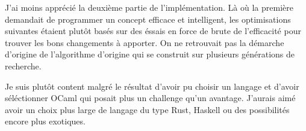 \documentclass[12pt]{article}
\begin{document}
J'ai moins apprécié la deuxième partie de l'implémentation. Là où la
première demandait de programmer un concept efficace et intelligent,
les optimisations suivantes étaient plutôt basés sur des éssais en
force de brute de l'efficacité pour trouver les bons changements à
apporter. On ne retrouvait pas la démarche d'origine de l'algorithme
d'origine qui se construit sur plusieurs générations de recherche.

Je suis plutôt content malgré le résultat d'avoir pu choisir un
langage et d'avoir séléctionner OCaml qui posait plus un challenge
qu'un avantage. J'aurais aimé avoir un choix plus large de langage du
type Rust, Haskell ou des possibilités encore plus exotiques.



\end{document}
